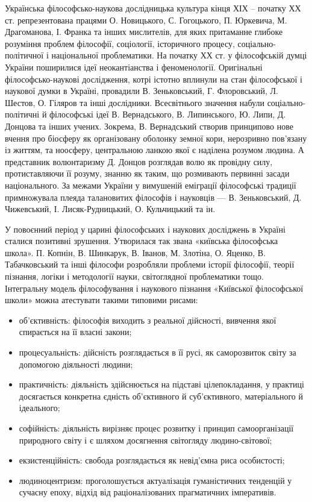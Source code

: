 Українська філософсько-наукова дослідницька культура кінця ХІХ –
початку ХХ ст. репрезентована працями О. Новицького, С. Гогоцького, П.
Юркевича, М. Драгоманова, І. Франка та інших мислителів, для яких
притаманне глибоке розуміння проблем філософії, соціології, історичного
процесу, соціально-політичної і національної проблематики. На початку ХХ ст.
у філософській думці України поширилися ідеї неокантіанства і феноменології.
Оригінальні філософсько-наукові дослідження, котрі істотно вплинули на стан
філософської і наукової думки в Україні, провадили В. Зеньковський, Г.
Флоровський, Л. Шестов, О. Гіляров та інші дослідники. Всесвітнього значення
набули соціально-політичні й філософські ідеї В. Вернадського, В.
Липинського, Ю. Липи, Д. Донцова та інших учених. Зокрема, В. Вернадський
створив принципово нове вчення про біосферу як організовану оболонку земної
кори, нерозривно пов’язану із життям, та ноосферу, центральною ланкою якої є
наділена розумом людина. А представник волюнтаризму Д. Донцов розглядав
волю як провідну силу, протиставляючи її розуму, знанню як таким, що
розмивають первинні засади національного. За межами України у вимушеній
еміграції філософські традиції примножувала плеяда талановитих філософів і
науковців --- В. Зеньковський, Д. Чижевський, І. Лисяк-Рудницький, О.
Кульчицький та ін.

У повоєнний період у царині філософських і наукових досліджень в Україні
сталися позитивні зрушення. Утворилася так звана «київська філософська
школа». П. Копнін, В. Шинкарук, В. Іванов, М. Злотіна, О. Яценко, В.
Табачковський та інші філософи розробляли проблеми історії філософії, теорії
пізнання, логіки і методології науки, світоглядної проблематики тощо.
Інтегральну модель філософування і наукового пізнання «Київської
філософської школи» можна атестувати такими типовими рисами:
\begin{itemize}
	\item об’єктивність: філософія виходить з реальної дійсності, вивчення якої
	спирається на її власні закони;
	
	\item процесуальність: дійсність розглядається в її русі, як саморозвиток світу
	за допомогою діяльності людини;
	
	\item практичність: діяльність здійснюється на підставі цілепокладання, у
	практиці досягається конкретна єдність об’єктивного й суб’єктивного,
	матеріального й ідеального;

	\item софійність: діяльність вирізняє процес розвитку і принцип самоорганізації
	природного світу і є шляхом досягнення світогляду людино-світової;

	\item екзистенційність: свобода розглядається як невід’ємна риса особистості;

	\item людиноцентризм: проголошується актуалізація гуманістичних тенденцій
	у сучасну епоху, відхід від раціоналізованих прагматичних імперативів.
\end{itemize}

